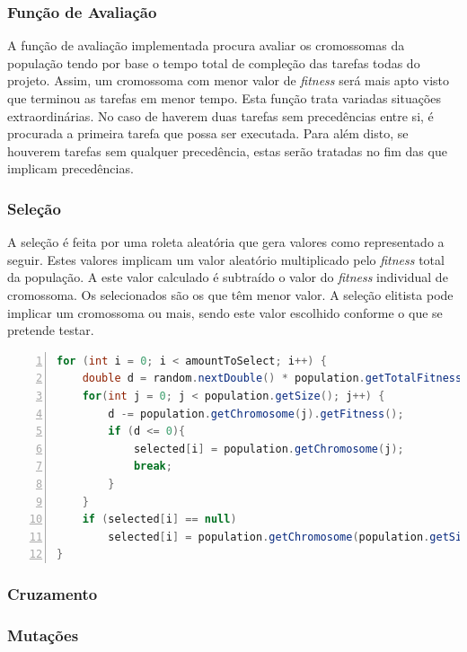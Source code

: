 \begin{titlepage}
\subsubsection{Função de Avaliação}

A função de avaliação implementada procura avaliar os cromossomas da população tendo por base o tempo total de compleção das tarefas todas do projeto. Assim, um cromossoma com menor valor de \textit{fitness} será mais apto visto que terminou as tarefas em menor tempo. Esta função trata variadas situações extraordinárias. No caso de haverem duas tarefas sem precedências entre si, é procurada a primeira tarefa que possa ser executada. Para além disto, se houverem tarefas sem qualquer precedência, estas serão tratadas no fim das que implicam precedências.

\subsubsection{Seleção}

A seleção é feita por uma roleta aleatória que gera valores como representado a seguir. Estes valores implicam um valor aleatório multiplicado pelo \textit{fitness} total da população. A este valor calculado é subtraído o valor do \textit{fitness} individual de cromossoma. Os selecionados são os que têm menor valor.  A seleção elitista pode implicar um cromossoma ou mais, sendo este valor escolhido conforme o que se pretende testar.

\begin{lstlisting}[frame=single, language=java,numbers=left,numberfirstline=true]  
for (int i = 0; i < amountToSelect; i++) {
	double d = random.nextDouble() * population.getTotalFitness();	
	for(int j = 0; j < population.getSize(); j++) {		
		d -= population.getChromosome(j).getFitness();		
		if (d <= 0){
			selected[i] = population.getChromosome(j);
			break;
		}
	}
	if (selected[i] == null)
		selected[i] = population.getChromosome(population.getSize() - 1); // in case of rounding errors
}
\end{lstlisting}

\subsubsection{Cruzamento}

\subsubsection{Mutações}


\end{titlepage}
